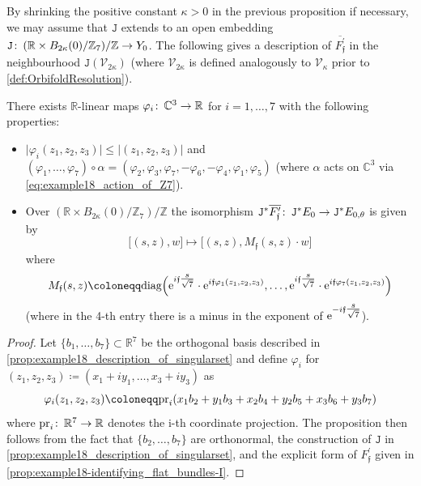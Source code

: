 \documentclass[11pt,a4paper]{scrartcl}
\newcommand{\col}{\colon \thinspace}
\newcommand{\pr}{\textup{pr}}
\newcommand{\e}{\textup{e}}
\numberwithin{equation}{section}
\theoremstyle{plain}
\theoremstyle{definition}
\theoremstyle{remark}
\begin{document}
By shrinking the positive constant $\kappa>0$ in the previous proposition if necessary, we may assume that $\mathtt{J}$ extends to an open embedding $\mathtt{J}\col (\mathbb{R}\times B_{2\kappa}(0)/\mathbb{Z}_7)/\mathbb{Z} \to Y_0$. The following gives a description of $\overline{F_\mathfrak{f}^\prime}$ in the neighbourhood $\mathtt{J}(\mathcal{V}_{2\kappa})$ (where $\mathcal{V}_{2\kappa}$ is defined analogously to $\mathcal{V}_\kappa$ prior to \autoref{def:OrbifoldResolution}).
\begin{proposition}
There exists $\mathbb{R}$-linear maps $\varphi_i \col \mathbb{C}^3 \to \mathbb{R}$ for $i=1,\dots,7$ with the following properties: 
\begin{itemize}
\item $\vert \varphi_i(z_1,z_2,z_3)\vert \leq \vert (z_1,z_2,z_3) \vert$ and $ (\varphi_1,\dots,\varphi_7) \circ \alpha = (\varphi_2,\varphi_3,\varphi_7,-\varphi_6,-\varphi_4,\varphi_1,\varphi_5)$ (where $\alpha$ acts on $\mathbb{C}^3$ via \eqref{eq:example18_action_of_Z7}).
\item Over $(\mathbb{R}\times B_{2\kappa}(0)/\mathbb{Z}_7)/\mathbb{Z}$ the isomorphism $\mathtt{J}^*\overline{F_{\mathfrak{f}}^\prime} \col \mathtt{J}^*E_0 \to \mathtt{J}^*E_{0,\theta}$ is given by \[ \big[(s,z),w \big] \mapsto \big[(s,z),M_\mathfrak{f}(s,z) \cdot w \big] \] where \[ M_\mathfrak{f}(s,z) \coloneqq \textup{diag}\Big(\e^{i\mathfrak{f}\tfrac{s}{\sqrt{7}}}\cdot\e^{i\mathfrak{f}\varphi_1(z_1,z_2,z_3)},\dots,\e^{i\mathfrak{f}\tfrac{s}{\sqrt{7}}}\cdot\e^{i\mathfrak{f}\varphi_7(z_1,z_2,z_3)} \Big) \] (where in the 4-th entry there is a minus in the exponent of $\e^{-i\mathfrak{f}\tfrac{s}{\sqrt{7}}}$).
\end{itemize}
\end{proposition}
\begin{proof}
Let $\{b_1,\dots,b_7\} \subset \mathbb{R}^7$ be the orthogonal basis described in \autoref{prop:example18_description_of_singularset} and define $\varphi_i$ for $(z_1,z_2,z_3) \coloneqq (x_1+iy_1,\dots,x_3+iy_3)$ as \[ \varphi_i(z_1,z_2,z_3) \coloneqq \pr_{i} (x_1b_2 + y_1 b_3+x_2 b_4+y_2 b_5+ x_3 b_6 + y_3 b_7)\] where $\pr_i \col \mathbb{R}^7 \to \mathbb{R}$ denotes the i-th coordinate projection. The proposition then follows from the fact that $\{b_2,\dots,b_7\}$ are orthonormal, the construction of $\mathtt{J}$ in \autoref{prop:example18_description_of_singularset}, and the explicit form of $F_\mathfrak{f}^\prime$ given in \autoref{prop:example18-identifying_flat_bundles-I}.
\end{proof}
\end{document}
